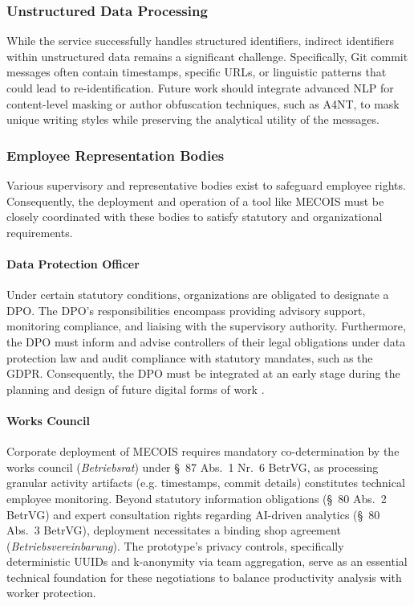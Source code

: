 \subsubsection{Unstructured Data Processing}
While the service successfully handles structured identifiers, indirect identifiers within unstructured data remains a significant challenge. Specifically, Git commit messages often contain timestamps, specific URLs, or linguistic patterns that could lead to re-identification. Future work should integrate advanced \ac{NLP} for content-level masking or author obfuscation techniques, such as \ac{A4NT}, to mask unique writing styles while preserving the analytical utility of the messages.

\subsubsection{Employee Representation Bodies}

Various supervisory and representative bodies exist to safeguard employee rights. Consequently, the deployment and operation of a tool like MECOIS must be closely coordinated with these bodies to satisfy statutory and organizational requirements.

\paragraph{Data Protection Officer}
Under certain statutory conditions, organizations are obligated to designate a \ac{DPO}. The \ac{DPO}'s responsibilities encompass providing advisory support, monitoring compliance, and liaising with the supervisory authority. Furthermore, the \ac{DPO} must inform and advise controllers of their legal obligations under data protection law and audit compliance with statutory mandates, such as the \ac{GDPR}. Consequently, the \ac{DPO} must be integrated at an early stage during the planning and design of future digital forms of work \autocite[392--394,400--402]{daeubler2017glaeserne}.

\paragraph{Works Council}
Corporate deployment of MECOIS requires mandatory co-determination by the works council (\textit{Betriebsrat}) under \S~87 Abs.~1 Nr.~6 BetrVG, as processing granular activity artifacts (e.g. timestamps, commit details) constitutes technical employee monitoring. Beyond statutory information obligations (\S~80 Abs.~2 BetrVG) and expert consultation rights regarding AI-driven analytics (\S~80 Abs.~3 BetrVG), deployment necessitates a binding shop agreement (\textit{Betriebsvereinbarung}). The prototype's privacy controls, specifically deterministic \acp{UUID} and k-anonymity via team aggregation, serve as an essential technical foundation for these negotiations to balance productivity analysis with worker protection.
\autocite[429]{daeubler2017glaeserne} \autocite[2-6,61--62,72--73,79--81,96--97,99--101,134,348--351]{niedenhoff2024betriebsraete}


